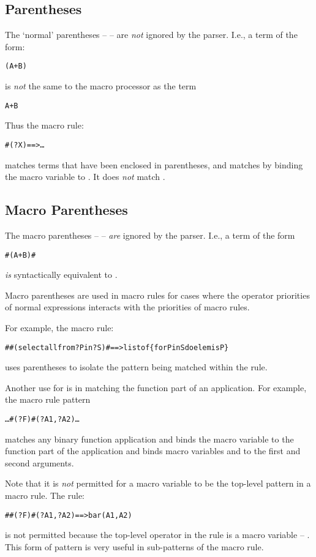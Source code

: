 \subsection{Parentheses}
The `normal' parentheses -- \q{()} -- are \emph{not} ignored by the parser. I.e., a term of the form:
\begin{alltt}
(A+B)
\end{alltt}
is \emph{not} the same to the macro processor as the term
\begin{alltt}
A+B
\end{alltt}
Thus the macro rule:
\begin{alltt}
# (?X) ==> \ldots
\end{alltt}
matches terms that have been enclosed in parentheses, and matches  by binding the macro variable  to . It does \emph{not} match .

\subsection{Macro Parentheses}
\label{macroParentheses}
The macro parentheses -- \q{\#(\ldots)\#} -- \emph{are} ignored by the parser. I.e., a term of the form
\begin{alltt}
\#(A+B)\#
\end{alltt}
\emph{is} syntactically equivalent to .

Macro parentheses are used in macro rules for cases where the operator priorities of normal expressions interacts with the priorities of macro rules. 

For example, the macro rule:
\begin{alltt}
# #(select all from ?P in ?S)# ==> list of \{ for P in S do elemis P \}
\end{alltt}
uses \q{\#()\#} parentheses to isolate the  pattern being matched within the rule.

Another use for \q{\#()\#} is in matching the function part of an application. For example, the macro rule pattern
\begin{alltt}
\ldots \#(?F)\#(?A1,?A2) \ldots
\end{alltt}
matches any binary function application and binds the macro variable  to the function part of the application and binds macro variables  and  to the first and second arguments.

\begin{aside}
Note that it is \emph{not} permitted for a macro variable to be the top-level pattern in a macro rule. The rule:
\begin{alltt}
# \#(?F)\#(?A1,?A2) ==> bar(A1,A2)
\end{alltt}
is not permitted because the top-level operator in the rule is a macro variable -- . This form of pattern is very useful in sub-patterns of the macro rule.
\end{aside}


